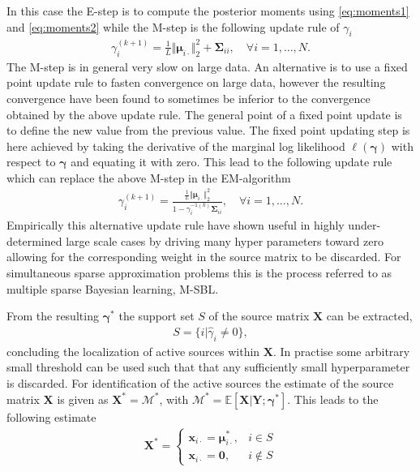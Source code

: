 In this case the E-step is to compute the posterior moments using \eqref{eq:moments1} and \eqref{eq:moments2} while the M-step is the following update rule of $\gamma_i$ \cite[p.147]{phd_wipf}
\begin{align*}
\gamma_i^{(k+1)} = \frac{1}{L} \Vert \boldsymbol{\mu}_{i \cdot} \Vert_2^2 + \boldsymbol{\Sigma}_{ii}, \quad \forall i = 1, \dots, N.
\end{align*}
The M-step is in general very slow on large data. 
An alternative is to use a fixed point update rule to fasten convergence on large data, however the resulting convergence have been found to sometimes be inferior to the convergence obtained by the above update rule\cite[p.147]{phd_wipf}. The general point of a fixed point update is to define the new value from the previous value. 
The fixed point updating step is here achieved by taking the derivative of the marginal log likelihood $\ell(\boldsymbol{\gamma})$ with respect to $\boldsymbol{\gamma}$ and equating it with zero. 
This lead to the following update rule which can replace the above M-step in the EM-algorithm \cite[p.147]{phd_wipf}
\begin{align}
\gamma_i^{(k+1)} = \frac{\frac{1}{L} \Vert \boldsymbol{\mu}_{i \cdot} \Vert_2^2}{1 - \gamma_i^{-1 (k)} \boldsymbol{\Sigma}_{ii}}, \quad \forall i = 1, \dots, N.
\end{align}
Empirically this alternative update rule have shown useful in highly under-determined large scale cases by driving many hyper parameters toward zero allowing for the corresponding weight in the source matrix to be discarded. 
For simultaneous sparse approximation problems this is the process referred to as multiple sparse Bayesian learning, M-SBL.

From the resulting $\boldsymbol{\gamma}^\ast$ the support set $S$ of the source matrix $\mathbf{X}$ can be extracted, 
\begin{align*}
S = \{ i \vert \hat{\gamma}_i \neq 0 \},
\end{align*}
concluding the localization of active sources within $\mathbf{X}$. 
In practise some arbitrary small threshold can be used such that that any sufficiently small hyperparameter is discarded\cite[p.149]{phd_wipf}.
For identification of the active sources the estimate of the source matrix $\mathbf{X}$ is given as $\mathbf{X}^\ast = \mathcal{M}^\ast $, with $\mathcal{M}^\ast = \mathbb{E}[\mathbf{X}\vert \mathbf{Y} ; \boldsymbol{\gamma}^\ast]$. 
This leads to the following estimate  
\begin{align*}
\mathbf{X}^\ast = 
\begin{cases}
\mathbf{x}_{i\cdot} = \boldsymbol{\mu}_{i \cdot}^\ast, & i \in S \\
\mathbf{x}_{i\cdot} = \mathbf{0}, & i \not \in S
\end{cases}
\end{align*}

